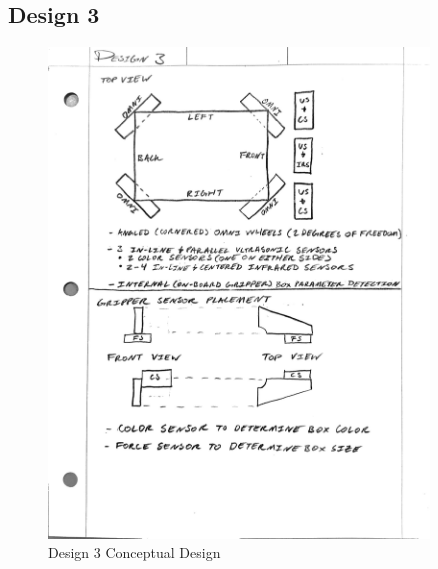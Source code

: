 \documentclass[12pt]{report}
\begin{document}
\subsection{Design 3}
\begin{figure}[H]
    \centering
    \includegraphics[width=0.9\textwidth]{Images/Designs/Design3.pdf}
    \caption{Design 3 Conceptual Design}
    \label{fig:design3}
\end{figure}
\end{document}
